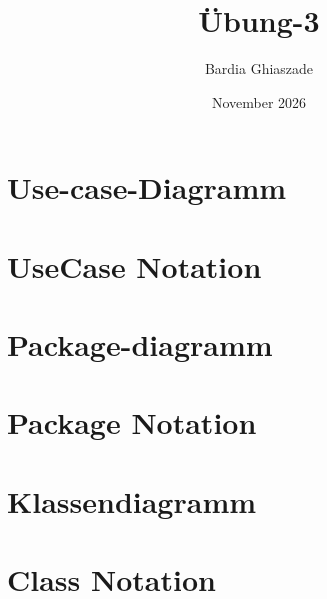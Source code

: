 \documentclass{article}
\title{Übung-3}
\author{Bardia Ghiaszade}
\date{November 2026}
\begin{document}
\maketitle

\section{Use-case-Diagramm}


\newpage

\section{UseCase Notation}


\newpage

\section{Package-diagramm}


\newpage

\section{Package Notation}


\newpage


\section{Klassendiagramm}



\newpage
\section{Class Notation}

\end{document}
